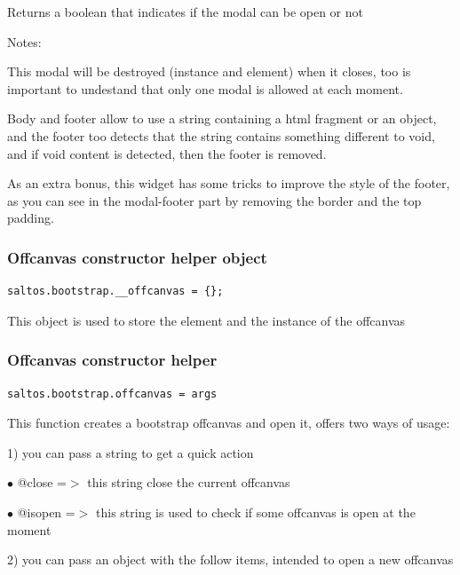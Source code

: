 \documentclass[a4paper]{article}
\begin{document}
Returns a boolean that indicates if the modal can be open or not

Notes:

This modal will be destroyed (instance and element) when it closes, too is important
to undestand that only one modal is allowed at each moment.

Body and footer allow to use a string containing a html fragment or an object, and
the footer too detects that the string contains something different to void, and if
void content is detected, then the footer is removed.

As an extra bonus, this widget has some tricks to improve the style of the footer, as
you can see in the modal-footer part by removing the border and the top padding.

\hypertarget{toc106}{}
\subsubsection{Offcanvas constructor helper object}

\begin{lstlisting}
saltos.bootstrap.__offcanvas = {};
\end{lstlisting}

This object is used to store the element and the instance of the offcanvas

\hypertarget{toc107}{}
\subsubsection{Offcanvas constructor helper}

\begin{lstlisting}
saltos.bootstrap.offcanvas = args
\end{lstlisting}

This function creates a bootstrap offcanvas and open it, offers two ways of usage:

1) you can pass a string to get a quick action

\begin{compactitem}
\item[\color{myblue}$\bullet$] @close  =$>$ this string close the current offcanvas
\item[\color{myblue}$\bullet$] @isopen =$>$ this string is used to check if some offcanvas is open at the moment
\end{compactitem}

2) you can pass an object with the follow items, intended to open a new offcanvas
\end{document}
